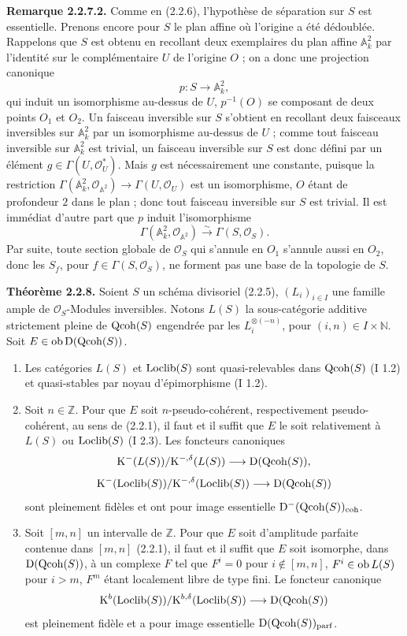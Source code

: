 \documentclass[11pt]{article}
\begin{document}
\textbf{Remarque 2.2.7.2.} Comme en (2.2.6), l'hypothèse de séparation sur $S$ est essentielle. Prenons encore pour $S$ le plan affine où l'origine a été dédoublée. Rappelons que $S$ est obtenu en recollant deux exemplaires du plan affine $\mathbb A^2_k$ par l'identité sur le complémentaire $U$ de l'origine $O$ ; on a donc une projection canonique
\[
p:S\longrightarrow\mathbb A^2_k,
\]
qui induit un isomorphisme au-dessus de $U$, $p^{-1}(O)$ se composant de deux points $O_1$ et $O_2$. Un faisceau inversible sur $S$ s'obtient en recollant deux faisceaux inversibles sur $\mathbb A^2_k$ par un isomorphisme au-dessus de $U$ ; comme tout faisceau inversible sur $\mathbb A^2_k$ est trivial, un faisceau inversible sur $S$ est donc défini par un élément $g\in\Gamma(U,\mathcal O_U^*)$. Mais $g$ est nécessairement une constante, puisque la restriction $\Gamma(\mathbb A^2_k,\mathcal O_{\mathbb A^2})\to\Gamma(U,\mathcal O_U)$ est un isomorphisme, $O$ étant de profondeur $2$ dans le plan ; donc tout faisceau inversible sur $S$ est trivial. Il est immédiat d'autre part que $p$ induit l'isomorphisme
\[
\Gamma(\mathbb A^2_k,\mathcal O_{\mathbb A^2})\xrightarrow{\sim}\Gamma(S,\mathcal O_S).
\]
Par suite, toute section globale de $\mathcal O_S$ qui s'annule en $O_1$ s'annule aussi en $O_2$, donc les $S_f$, pour $f\in\Gamma(S,\mathcal O_S)$, ne forment pas une base de la topologie de $S$.

\textbf{Théorème 2.2.8.} Soient $S$ un schéma divisoriel (2.2.5), $(L_i)_{i\in I}$ une famille ample de $\mathcal O_S$-Modules inversibles. Notons $L(S)$ la sous-catégorie additive strictement pleine de $\operatorname{Qcoh}(S)$ engendrée par les $L_i^{\otimes(-n)}$, pour $(i,n)\in I\times\mathbb N$. Soit $E\in\operatorname{ob}\mathrm D(\operatorname{Qcoh}(S))$.
\begin{enumerate}[label=\alph*)]
\item Les catégories $L(S)$ et $\operatorname{Loclib}(S)$ sont quasi-relevables dans $\operatorname{Qcoh}(S)$ (I 1.2) et quasi-stables par noyau d'épimorphisme (I 1.2).
\item Soit $n\in\mathbb Z$. Pour que $E$ soit $n$-pseudo-cohérent, respectivement pseudo-cohérent, au sens de (2.2.1), il faut et il suffit que $E$ le soit relativement à $L(S)$ ou $\operatorname{Loclib}(S)$ (I 2.3). Les foncteurs canoniques
\[
\mathrm K^{-}(L(S))/\mathrm K^{-,\delta}(L(S))\longrightarrow \mathrm D(\operatorname{Qcoh}(S)),
\]
\[
\mathrm K^{-}(\operatorname{Loclib}(S))/\mathrm K^{-,\delta}(\operatorname{Loclib}(S))\longrightarrow \mathrm D(\operatorname{Qcoh}(S))
\]
sont pleinement fidèles et ont pour image essentielle $\mathrm D^{-}(\operatorname{Qcoh}(S))_{\operatorname{coh}}$.
\item Soit $[m,n]$ un intervalle de $\mathbb Z$. Pour que $E$ soit d'amplitude parfaite contenue dans $[m,n]$ (2.2.1), il faut et il suffit que $E$ soit isomorphe, dans $\mathrm D(\operatorname{Qcoh}(S))$, à un complexe $F$ tel que $F^i=0$ pour $i\notin[m,n]$, $F^i\in\operatorname{ob} L(S)$ pour $i>m$, $F^m$ étant localement libre de type fini. Le foncteur canonique
\[
\mathrm K^b(\operatorname{Loclib}(S))/\mathrm K^{b,\delta}(\operatorname{Loclib}(S))\longrightarrow \mathrm D(\operatorname{Qcoh}(S))
\]
est pleinement fidèle et a pour image essentielle $\mathrm D(\operatorname{Qcoh}(S))_{\operatorname{parf}}$.
\end{enumerate}
\end{document}
